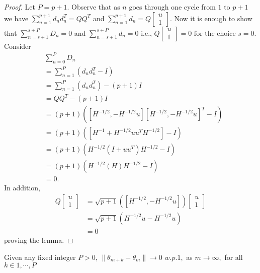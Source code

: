\begin{proof}
 Let $P=p+1$. Observe that as $n$ goes through one cycle from $1$ to $p+1$ we have
 $\sum\limits_{n=1}^{p+1}d_nd_n^T=QQ^T$ and 
 $\sum\limits_{n=1}^{p+1}d_n= Q\left[\begin{array}{cccc}
 u\\ 1 \end{array}\right]$.
 Now it is enough to show that
 $\sum\limits_{n=s+1}^{s+P}D_n=0$ and 
 $\sum\limits_{n=s+1}^{s+P}d_n= 0$ i.e., 
 $Q\left[\begin{array}{cccc}
 u\\ 1 \end{array}\right]=0 \text{ for the choice } s=0.$
 Consider
 \begin{align*}
 & \sum_{n=0}^{P}D_n\\
 & =\sum_{n=1}^{P}(d_nd_n^T-I)\\
 & =\sum_{n=1}^{P}(d_nd_n^T)-(p+1)I\\
 & =QQ^T-(p+1)I\\
 & =(p+1)([H^{-1/2},-H^{-1/2}u][H^{-1/2},-H^{-1/2}u]^T-I)\\
 & =(p+1)([H^{-1}+H^{-1/2}uu^TH^{-1/2}]-I)\\
 & =(p+1)(H^{-1/2}(I+uu^T)H^{-1/2}-I)\\
 & =(p+1)(H^{-1/2}(H)H^{-1/2}-I)\\
 & = 0.
 \end{align*}
 In addition,
 \begin{align*}
 Q\left[\begin{array}{cccc}
 u\\ 1 \end{array}\right]
 & = \sqrt{p+1}([H^{-1/2},-H^{-1/2}u]) \left[\begin{array}{cccc}
 u\\ 1 \end{array}\right]\\
 & = \sqrt{p+1}(H^{-1/2}u-H^{-1/2}u)\\
 & = 0
 \end{align*}
proving the lemma.
\end{proof}
\begin{lemma}
 Given any fixed integer $P>0$, $\|\theta_{m+k}-\theta_{m}\| \rightarrow 0$ $w.p.1,$ as
 $m \rightarrow \infty,$ for all $k \in {1,\cdots, P}$
\end{lemma}

